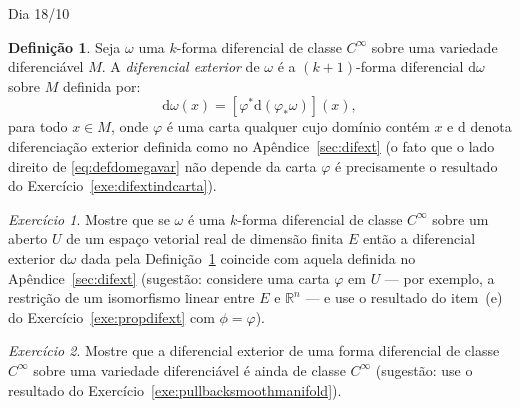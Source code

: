 \documentclass[oneside,11pt]{amsart}
\newcommand{\R}{\mathds R}
\newcommand{\dd}{\mathrm d}
\theoremstyle{remark}\newtheorem{exercise}{Exercício}[section]
\theoremstyle{plain}\newtheorem{teo}{Teorema}[section]
\theoremstyle{plain}\newtheorem{lem}[teo]{Lema}
\theoremstyle{plain}\newtheorem{prop}[teo]{Proposição}
\theoremstyle{definition}\newtheorem{defin}[teo]{Definição}
\theoremstyle{remark}\newtheorem{rem}[teo]{Observação}
\theoremstyle{definition}\newtheorem{example}[teo]{Exemplo}
\numberwithin{equation}{section}
\begin{document}
\begin{section}{Dia 18/10}
\begin{defin}\label{thm:defdifomegavar}
Seja $\omega$ uma $k$-forma diferencial de classe $C^\infty$ sobre uma variedade diferenciável $M$. A {\em diferencial exterior\/}
de $\omega$ é a $(k+1)$-forma diferencial $\dd\omega$ sobre $M$ definida por:
\begin{equation}\label{eq:defdomegavar}
\dd\omega(x)=[\varphi^*\dd(\varphi_*\omega)](x),
\end{equation}
para todo $x\in M$, onde $\varphi$ é uma carta qualquer cujo domínio contém $x$ e $\dd$ denota diferenciação exterior definida como no Apêndice~\ref{sec:difext}
(o fato que o lado direito de \eqref{eq:defdomegavar} não depende da carta
$\varphi$ é precisamente o resultado do Exercício~\ref{exe:difextindcarta}).
\end{defin}

\begin{exercise}
Mostre que se $\omega$ é uma $k$-forma diferencial de classe $C^\infty$ sobre um aberto $U$ de um espaço vetorial real de dimensão finita $E$ então
a diferencial exterior $\dd\omega$ dada pela Definição~\ref{thm:defdifomegavar} coincide com aquela definida no Apêndice~\ref{sec:difext}
(sugestão: considere uma carta $\varphi$ em $U$ --- por exemplo, a restrição de um isomorfismo linear entre $E$ e $\R^n$ --- e use o resultado do
item~(e) do Exercício~\ref{exe:propdifext} com $\phi=\varphi$).
\end{exercise}

\begin{exercise}
Mostre que a diferencial exterior de uma forma diferencial de classe $C^\infty$ sobre uma variedade diferenciável é ainda de classe $C^\infty$ (sugestão:
use o resultado do Exercício~\ref{exe:pullbacksmoothmanifold}).
\end{exercise}


\end{section}
\end{document}
